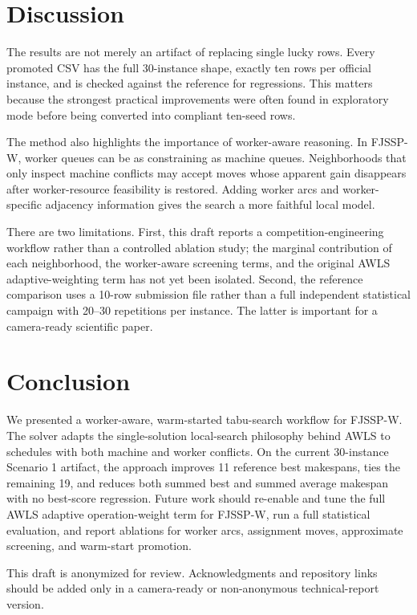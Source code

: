\documentclass[sigconf,anonymous,review,dvipsnames]{acmart}
\begin{document}
\section{Discussion}
The results are not merely an artifact of replacing single lucky rows.
Every promoted CSV has the full 30-instance shape, exactly ten rows per official instance, and is checked against the reference for regressions.
This matters because the strongest practical improvements were often found in exploratory mode before being converted into compliant ten-seed rows.

The method also highlights the importance of worker-aware reasoning.
In FJSSP-W, worker queues can be as constraining as machine queues.
Neighborhoods that only inspect machine conflicts may accept moves whose apparent gain disappears after worker-resource feasibility is restored.
Adding worker arcs and worker-specific adjacency information gives the search a more faithful local model.

There are two limitations.
First, this draft reports a competition-engineering workflow rather than a controlled ablation study; the marginal contribution of each neighborhood, the worker-aware screening terms, and the original AWLS adaptive-weighting term has not yet been isolated.
Second, the reference comparison uses a 10-row submission file rather than a full independent statistical campaign with 20--30 repetitions per instance.
The latter is important for a camera-ready scientific paper.

\section{Conclusion}
We presented a worker-aware, warm-started tabu-search workflow for FJSSP-W.
The solver adapts the single-solution local-search philosophy behind AWLS to schedules with both machine and worker conflicts.
On the current 30-instance Scenario 1 artifact, the approach improves 11 reference best makespans, ties the remaining 19, and reduces both summed best and summed average makespan with no best-score regression.
Future work should re-enable and tune the full AWLS adaptive operation-weight term for FJSSP-W, run a full statistical evaluation, and report ablations for worker arcs, assignment moves, approximate screening, and warm-start promotion.

\begin{acks}
This draft is anonymized for review. Acknowledgments and repository links should be added only in a camera-ready or non-anonymous technical-report version.
\end{acks}



\end{document}
